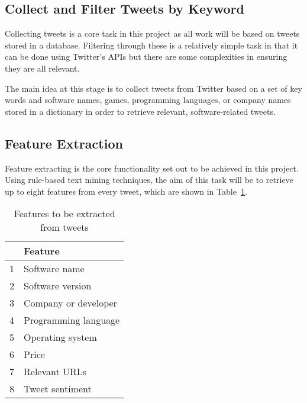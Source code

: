 \subsection{Collect and Filter Tweets by Keyword}
Collecting tweets is a core task in this project as all work will be based on tweets stored in a database. Filtering through these is a relatively simple task in that it can be done using Twitter's APIs but there are some complexities in ensuring they are all relevant.

The main idea at this stage is to collect tweets from Twitter based on a set of key words and software names, games, programming languages, or company names stored in a dictionary in order to retrieve relevant, software-related tweets.

\subsection{Feature Extraction}
Feature extracting is the core functionality set out to be achieved in this project. Using rule-based text mining techniques, the aim of this task will be to retrieve up to eight features from every tweet, which are shown in Table~\ref{features}.

\begin{table}
\begin{center}
\begin{tabular}{|r|l|}\hline\hline
&Feature\\\hline
1&Software name\\
2&Software version\\
3&Company or developer\\
4&Programming language\\
5&Operating system\\
6&Price\\
7&Relevant URLs\\
8&Tweet sentiment\\\hline\hline
\end{tabular}
\end{center}
\caption{Features to be extracted from tweets}\label{features}
\end{table}

